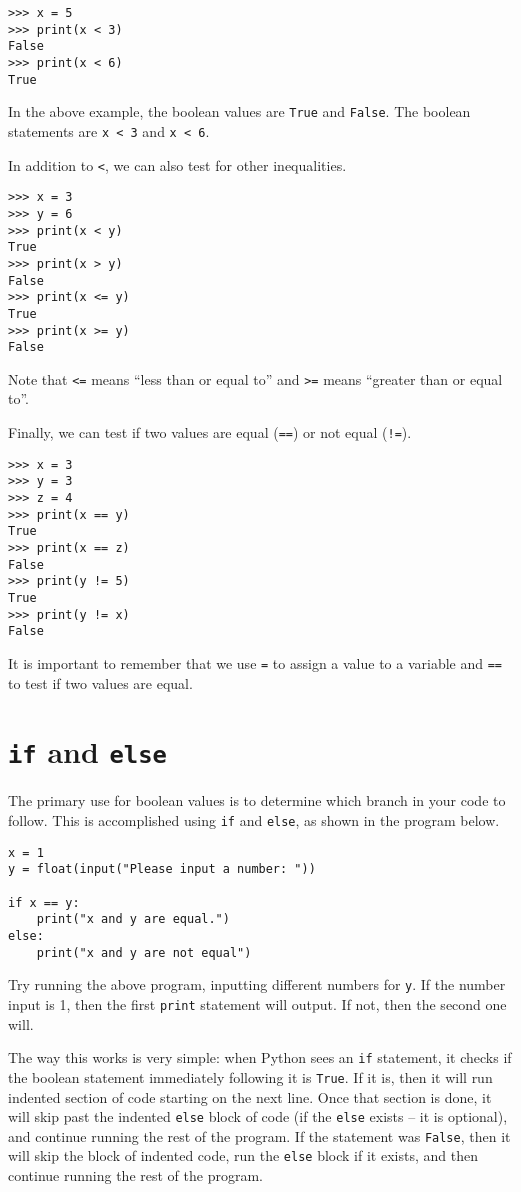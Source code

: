 \documentclass[12pt,hidelinks]{article}
\begin{document}
\begin{lstlisting}[style=bash]
>>> x = 5
>>> print(x < 3)
False
>>> print(x < 6)
True
\end{lstlisting}

In the above example, the boolean values are \texttt{True} and \texttt{False}. The boolean statements are \texttt{x < 3} and \texttt{x < 6}.

In addition to \texttt{<}, we can also test for other inequalities.

\begin{lstlisting}[style=bash]
>>> x = 3
>>> y = 6
>>> print(x < y)
True
>>> print(x > y)
False
>>> print(x <= y)
True
>>> print(x >= y)
False
\end{lstlisting}

Note that \texttt{<=} means ``less than or equal to'' and \texttt{>=} means ``greater than or equal to''.

Finally, we can test if two values are equal (\texttt{==}) or not equal (\texttt{!=}).

\begin{lstlisting}[style=bash]
>>> x = 3
>>> y = 3
>>> z = 4
>>> print(x == y)
True
>>> print(x == z)
False
>>> print(y != 5)
True
>>> print(y != x)
False
\end{lstlisting}

It is important to remember that we use \texttt{=} to assign a value to a variable and \texttt{==} to test if two values are equal.

\section{\texttt{if} and \texttt{else}}
The primary use for boolean values is to determine which branch in your code to follow. This is accomplished using \texttt{if} and \texttt{else}, as shown in the program below.

\begin{lstlisting}[style=python]
x = 1
y = float(input("Please input a number: "))

if x == y:
    print("x and y are equal.")
else:
    print("x and y are not equal")
\end{lstlisting}

Try running the above program, inputting different numbers for \texttt{y}. If the number input is 1, then the first \texttt{print} statement will output. If not, then the second one will.

The way this works is very simple: when Python sees an \texttt{if} statement, it checks if the boolean statement immediately following it is \texttt{True}. If it is, then it will run indented section of code starting on the next line. Once that section is done, it will skip past the indented \texttt{else} block of code (if the \texttt{else} exists -- it is optional), and continue running the rest of the program. If the statement was \texttt{False}, then it will skip the block of indented code, run the \texttt{else} block if it exists, and then continue running the rest of the program.
\end{document}
